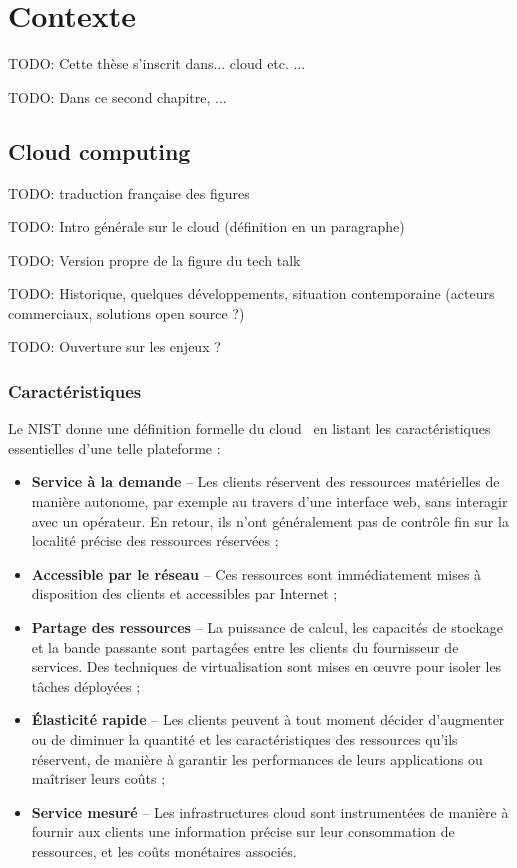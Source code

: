 \clearemptydoublepage
\chapter{Contexte}
\label{chapter:context}

TODO: Cette thèse s'inscrit dans... cloud etc. ...

TODO: Dans ce second chapitre, ...

\section{Cloud computing}

TODO: traduction française des figures

TODO: Intro générale sur le cloud (définition en un paragraphe)

TODO: Version propre de la figure du tech talk

TODO: Historique, quelques développements, situation contemporaine (acteurs commerciaux, solutions open source ?)

TODO: Ouverture sur les enjeux ?

\subsection{Caractéristiques}

Le NIST donne une définition formelle du cloud~\cite{mellNISTDefinitionCloud} en listant les caractéristiques essentielles d'une telle plateforme :

\begin{itemize}
    \item \textbf{Service à la demande} -- Les clients réservent des ressources matérielles de manière autonome, par exemple au travers d'une interface web, sans interagir avec un opérateur. En retour, ils n'ont généralement pas de contrôle fin sur la localité précise des ressources réservées ;
    \item \textbf{Accessible par le réseau} -- Ces ressources sont immédiatement mises à disposition des clients et accessibles par Internet ;
    \item \textbf{Partage des ressources} -- La puissance de calcul, les capacités de stockage et la bande passante sont partagées entre les clients du fournisseur de services. Des techniques de virtualisation sont mises en œuvre pour isoler les tâches déployées ;
    \item \textbf{Élasticité rapide} -- Les clients peuvent à tout moment décider d'augmenter ou de diminuer la quantité et les caractéristiques des ressources qu'ils réservent, de manière à garantir les performances de leurs applications ou maîtriser leurs coûts ;
    \item \textbf{Service mesuré} -- Les infrastructures cloud sont instrumentées de manière à fournir aux clients une information précise sur leur consommation de ressources, et les coûts monétaires associés.
\end{itemize}

